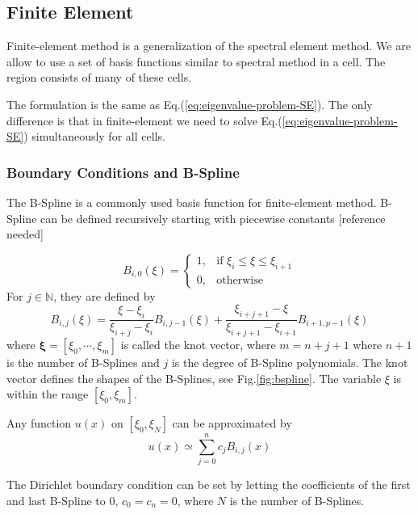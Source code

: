 \subsection{Finite Element}
Finite-element method is a generalization of the spectral element method. We are allow to use a set of basis functions similar to spectral method in a cell. The region consists of many of these cells.

The formulation is the same as Eq.(\ref{eq:eigenvalue-problem-SE}). The only difference is that in finite-element we need to solve Eq.(\ref{eq:eigenvalue-problem-SE}) simultaneously for all cells.

\subsubsection{Boundary Conditions and B-Spline}
The B-Spline is a commonly used basis function for finite-element method. B-Spline can be defined recursively starting with piecewise constants [reference needed]

\begin{equation}
	B_{i,0}(\xi) = \begin{cases}
		1, &\text{if } \xi_i\leq \xi \leq \xi_{i+1} \\
		0, &\text{otherwise}
	\end{cases}
\end{equation}
For $j\in\mathbb{N}$, they are defined by
\begin{equation}
	B_{i,j}(\xi) = \frac{\xi-\xi_i}{\xi_{i+j}-\xi_i}B_{i,j-1}(\xi) 
	+ \frac{\xi_{i+j+1}-\xi}{\xi_{i+j+1}-\xi_{i+1}}B_{i+1,p-1}(\xi) 
\end{equation}
where $\mathbf{\xi}=[\xi_0,\cdots,\xi_m]$ is called the knot vector, where $m=n+j+1$ where $n+1$ is the number of B-Splines and $j$ is the degree of B-Spline polynomials. The knot vector defines the shapes of the B-Splines, see Fig.\ref{fig:bspline}. The variable $\xi$ is within the range $[\xi_0, \xi_m]$. 

Any function $u(x)$ on $[\xi_0,\xi_N]$ can be approximated by
\[ u(x) \simeq \sum_{j=0}^{n} c_jB_{i,j}(x) \]

The Dirichlet boundary condition can be set by letting the coefficients of the first and last B-Spline to 0, $c_{0}=c_{n} = 0$, where $N$ is the number of B-Splines.

